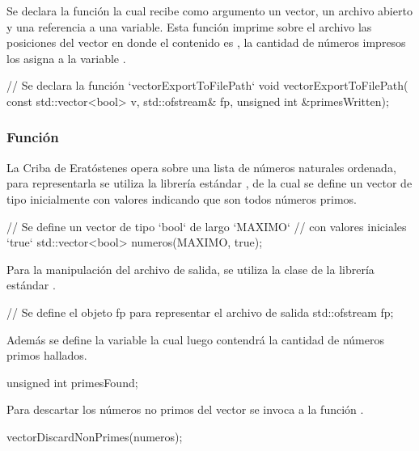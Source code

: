 \documentclass[12pt]{article}
\newenvironment{fullgrayverb}
{\verbbox}
{\endverbbox\par\colorbox{gray!25}{\parbox{\textwidth}{\theverbbox}}\par}
\begin{document}
Se declara la función  la cual recibe como
argumento un vector, un archivo abierto y una referencia a una variable. Esta
función imprime sobre el archivo las posiciones del vector en donde el
contenido es , la cantidad de números impresos los asigna a la
variable .

\begin{fullgrayverb}[\mbox{}]
// Se declara la función `vectorExportToFilePath`
void vectorExportToFilePath(
         const std::vector<bool> v,
         std::ofstream& fp,
         unsigned int &primesWritten);
\end{fullgrayverb}

\subsubsection{Función }

La Criba de Eratóstenes opera sobre una lista de números naturales ordenada,
para representarla se utiliza la librería estándar , de la cual
se define un vector de tipo  inicialmente con valores 
indicando que son todos números primos.

\begin{fullgrayverb}[\mbox{}]
// Se define un vector de tipo `bool` de largo `MAXIMO`
// con valores iniciales `true`
std::vector<bool> numeros(MAXIMO, true);
\end{fullgrayverb}

\pagebreak
Para la manipulación del archivo de salida, se utiliza la clase 
de la librería estándar .

\begin{fullgrayverb}[\mbox{}]
// Se define el objeto fp para representar el archivo de salida
std::ofstream fp;
\end{fullgrayverb}

Además se define la variable  la cual luego contendrá la
cantidad de números primos hallados.

\begin{fullgrayverb}[\mbox{}]
unsigned int primesFound;
\end{fullgrayverb}

Para descartar los números no primos del vector  se invoca a la
función \linebreak{}.

\begin{fullgrayverb}[\mbox{}]
vectorDiscardNonPrimes(numeros);
\end{fullgrayverb}
\end{document}
